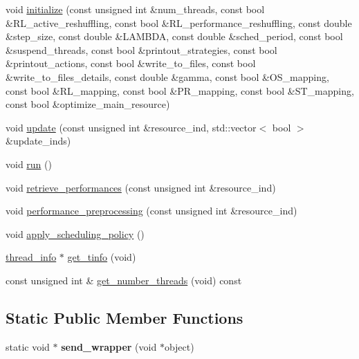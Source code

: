 \begin{DoxyCompactItemize}
\item 
void \hyperlink{classScheduler_a27e2a247cde3ad80ac25b9188a1e17ee}{initialize} (const unsigned int \&num\-\_\-threads, const bool \&R\-L\-\_\-active\-\_\-reshuffling, const bool \&R\-L\-\_\-performance\-\_\-reshuffling, const double \&step\-\_\-size, const double \&L\-A\-M\-B\-D\-A, const double \&sched\-\_\-period, const bool \&suspend\-\_\-threads, const bool \&printout\-\_\-strategies, const bool \&printout\-\_\-actions, const bool \&write\-\_\-to\-\_\-files, const bool \&write\-\_\-to\-\_\-files\-\_\-details, const double \&gamma, const bool \&O\-S\-\_\-mapping, const bool \&R\-L\-\_\-mapping, const bool \&P\-R\-\_\-mapping, const bool \&S\-T\-\_\-mapping, const bool \&optimize\-\_\-main\-\_\-resource)
\item 
void \hyperlink{classScheduler_ac0f68dd6a14fdf70dc964c67dc8d39b2}{update} (const unsigned int \&resource\-\_\-ind, std\-::vector$<$ bool $>$ \&update\-\_\-inds)
\item 
void \hyperlink{classScheduler_a58fba108ce2748870a6288cd6f5fd1e3}{run} ()
\item 
void \hyperlink{classScheduler_ad187198f24a2b283a4628f0e0b3ffd84}{retrieve\-\_\-performances} (const unsigned int \&resource\-\_\-ind)
\item 
void \hyperlink{classScheduler_a2e8eeafda5ee215213d1a8ad076e86e7}{performance\-\_\-preprocessing} (const unsigned int \&resource\-\_\-ind)
\item 
void \hyperlink{classScheduler_a782dd674fc65f8f96bbcdad24e48b75e}{apply\-\_\-scheduling\-\_\-policy} ()
\item 
\hyperlink{structthread__info}{thread\-\_\-info} $\ast$ \hyperlink{classScheduler_a9e0189d3b9815eac90901ba171722525}{get\-\_\-tinfo} (void)
\item 
const unsigned int \& \hyperlink{classScheduler_ab640e06ed98152a9acd8cf032b7ad455}{get\-\_\-number\-\_\-threads} (void) const 
\end{DoxyCompactItemize}
\subsection*{Static Public Member Functions}
\begin{DoxyCompactItemize}
\item 
\hypertarget{classScheduler_adc23bd3b2f1babde08ce237c8f43cc19}{static void $\ast$ {\bfseries send\-\_\-wrapper} (void $\ast$object)}\label{classScheduler_adc23bd3b2f1babde08ce237c8f43cc19}

\end{DoxyCompactItemize}
